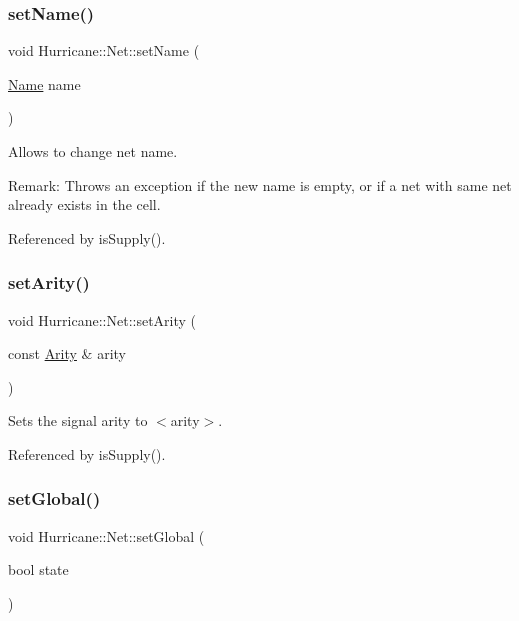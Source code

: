 \mbox{\label{classHurricane_1_1Net_a1a39702b9f4d26ba29ad0dafcdddf840}} 
\subsubsection{\texorpdfstring{set\+Name()}{setName()}}
{\footnotesize\ttfamily void Hurricane\+::\+Net\+::set\+Name (\begin{DoxyParamCaption}\item[{\hyperlink{classHurricane_1_1Name}{Name}}]{name }\end{DoxyParamCaption})}

Allows to change net name.

\begin{DoxyParagraph}{Remark\+:}
Throws an exception if the new name is empty, or if a net with same net already exists in the cell. 
\end{DoxyParagraph}


Referenced by is\+Supply().

\mbox{\label{classHurricane_1_1Net_af5dfdca4401902ee7e1e46a1a486da38}} 
\subsubsection{\texorpdfstring{set\+Arity()}{setArity()}}
{\footnotesize\ttfamily void Hurricane\+::\+Net\+::set\+Arity (\begin{DoxyParamCaption}\item[{const \hyperlink{classHurricane_1_1Net_a3a242d929e0c733f90f3f69be8cc427b}{Arity} \&}]{arity }\end{DoxyParamCaption})}

Sets the signal arity to {\ttfamily $<$arity$>$}. 

Referenced by is\+Supply().

\mbox{\label{classHurricane_1_1Net_a35c84afd9dade0cb715602bcf8ec8865}} 
\subsubsection{\texorpdfstring{set\+Global()}{setGlobal()}}
{\footnotesize\ttfamily void Hurricane\+::\+Net\+::set\+Global (\begin{DoxyParamCaption}\item[{bool}]{state }\end{DoxyParamCaption})}

